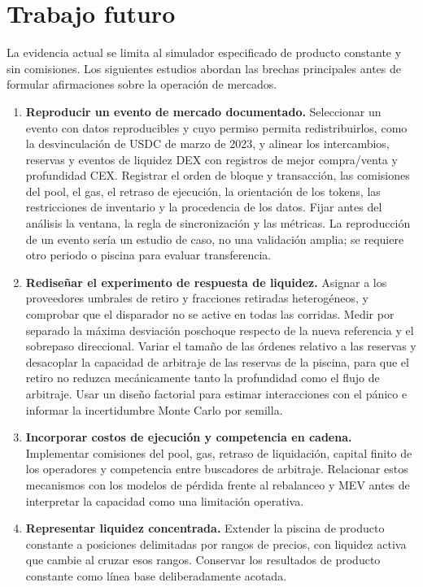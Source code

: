 \chapter{Trabajo futuro}
\label{cap:futuro}

La evidencia actual se limita al simulador especificado de producto constante y sin comisiones. Los siguientes estudios abordan las brechas principales antes de formular afirmaciones sobre la operación de mercados.

\begin{enumerate}
  \item \textbf{Reproducir un evento de mercado documentado.} Seleccionar un evento con datos reproducibles y cuyo permiso permita redistribuirlos, como la desvinculación de USDC de marzo de 2023, y alinear los intercambios, reservas y eventos de liquidez DEX con registros de mejor compra/venta y profundidad CEX. Registrar el orden de bloque y transacción, las comisiones del pool, el gas, el retraso de ejecución, la orientación de los tokens, las restricciones de inventario y la procedencia de los datos. Fijar antes del análisis la ventana, la regla de sincronización y las métricas. La reproducción de un evento sería un estudio de caso, no una validación amplia; se requiere otro periodo o piscina para evaluar transferencia.
  \item \textbf{Rediseñar el experimento de respuesta de liquidez.} Asignar a los proveedores umbrales de retiro y fracciones retiradas heterogéneos, y comprobar que el disparador no se active en todas las corridas. Medir por separado la máxima desviación poschoque respecto de la nueva referencia y el sobrepaso direccional. Variar el tamaño de las órdenes relativo a las reservas y desacoplar la capacidad de arbitraje de las reservas de la piscina, para que el retiro no reduzca mecánicamente tanto la profundidad como el flujo de arbitraje. Usar un diseño factorial para estimar interacciones con el pánico e informar la incertidumbre Monte Carlo por semilla.
  \item \textbf{Incorporar costos de ejecución y competencia en cadena.} Implementar comisiones del pool, gas, retraso de liquidación, capital finito de los operadores y competencia entre buscadores de arbitraje. Relacionar estos mecanismos con los modelos de pérdida frente al rebalanceo y MEV antes de interpretar la capacidad como una limitación operativa.
  \item \textbf{Representar liquidez concentrada.} Extender la piscina de producto constante a posiciones delimitadas por rangos de precios, con liquidez activa que cambie al cruzar esos rangos. Conservar los resultados de producto constante como línea base deliberadamente acotada.

\end{enumerate}
